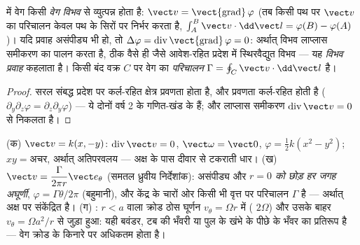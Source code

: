 \begin{definition}[वेग विभव; परिचालन]\label{def:b2:fluid-kinematics:potential}
 में वेग किसी \emph{वेग
विभव} से व्युत्पन्न होता है: $\vect v = \operatorname{\vect{grad}}\varphi$ (तब किसी पथ पर
$\vect v$ का परिचालन केवल पथ के सिरों पर निर्भर करता है, $\int_A^B\vect v
\cdot\dd\vect l = \varphi(B) - \varphi(A)$)। यदि प्रवाह
असंपीड्य भी हो, तो $\Delta\varphi = \operatorname{div}\operatorname{\vect{grad}}
\varphi = 0$: अर्थात् विभव लाप्लास समीकरण का पालन करता है, ठीक वैसे ही जैसे
आवेश-रहित प्रदेश में स्थिरवैद्युत विभव --- यह \emph{विभव
प्रवाह} कहलाता है। किसी बंद वक्र $C$ पर वेग का \emph{परिचालन}
$\Gamma = \oint_C\vect v\cdot\dd\vect l$ है।
\end{definition}

\begin{proof}
सरल संबद्ध प्रदेश पर कर्ल-रहित क्षेत्र प्रवणता होता है, और
प्रवणता कर्ल-रहित होती है ($\partial_y\partial_z\varphi = \partial_z\partial_y\varphi$) ---
ये दोनों वर्ष 2 के गणित-खंड के हैं; और लाप्लास समीकरण
$\operatorname{div}\vect v = 0$ से निकलता है।
\end{proof}

\begin{example}[तीन समतल प्रवाह]\label{ex:b2:fluid-kinematics:planeflows}
(क) \emph{} $\vect v = k(x, -y)$: $\operatorname{div}\vect v =
0$, $\vect\omega = \vect 0$, $\varphi = \tfrac12k(x^2 - y^2)$; 
$xy = \text{अचर}$, अर्थात् अतिपरवलय --- अक्ष के पास दीवार से टकराती धार। (ख)
\emph{} $\vect v = \dfrac{\Gamma}{2\pi r}\vect e_\theta$ (समतल
ध्रुवीय निर्देशांक): असंपीड्य और \emph{$r = 0$ को छोड़ हर जगह
अघूर्णी}, $\varphi = \Gamma\theta/2\pi$ (बहुमानी), और केंद्र के चारों ओर
किसी भी वृत्त पर परिचालन $\Gamma$ है --- अर्थात्
 अक्ष पर संकेंद्रित है। (ग) \emph{}: $r < a$ वाला
क्रोड ठोस घूर्णन $v_\theta = \Omega r$ में ( $2\Omega$)
और उसके बाहर  $v_\theta = \Omega a^2/r$ से जुड़ा हुआ: यही
बवंडर, टब की भँवरी या पुल के खंभे के पीछे के भँवर का प्रतिरूप है ---
वेग क्रोड के किनारे पर अधिकतम होता है।
\end{example}

